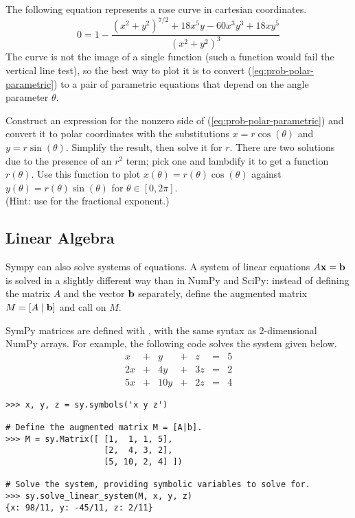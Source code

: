 \begin{problem}
The following equation represents a rose curve in cartesian coordinates.
\begin{equation}
0 = 1 - \frac{(x^2 + y^2)^{7/2} + 18x^5 y - 60x^3 y^3 + 18xy^5}{(x^2 + y^2)^3}
\label{eq:prob-polar-parametric}
\end{equation}
The curve is not the image of a single function (such a function would fail the vertical line test), so the best way to plot it is to convert (\ref{eq:prob-polar-parametric}) to a pair of parametric equations that depend on the angle parameter $\theta$.

Construct an expression for the nonzero side of (\ref{eq:prob-polar-parametric}) and convert it to polar coordinates with the substitutions $x = r\cos(\theta)$ and $y = r\sin(\theta)$.
Simplify the result, then solve it for $r$.
There are two solutions due to the presence of an $r^2$ term; pick one and lambdify it to get a function $r(\theta)$.
Use this function to plot $x(\theta) = r(\theta)\cos(\theta)$ against $y(\theta) = r(\theta)\sin(\theta)$ for $\theta \in [0,2\pi]$.
\\(Hint: use  for the fractional exponent.)
\end{problem}

\subsection*{Linear Algebra} %

Sympy can also solve systems of equations.
A system of linear equations $A\mathbf{x} = \mathbf{b}$ is solved in a slightly different way than in NumPy and SciPy: instead of defining the matrix $A$ and the vector $\mathbf{b}$ separately, define the augmented matrix $M = [A\mid\mathbf{b}]$ and call  on $M$.

SymPy matrices are defined with , with the same syntax as $2$-dimensional NumPy arrays.
For example, the following code solves the system given below.
\[
\begin{array}{rrrrrrr}
 x & + &   y & + &  z & = & 5 \\
2x & + &  4y & + & 3z & = & 2 \\
5x & + & 10y & + & 2z & = & 4
\end{array}
\]
\begin{lstlisting}
>>> x, y, z = sy.symbols('x y z')

# Define the augmented matrix M = [A|b].
>>> M = sy.Matrix([ [1,  1, 1, 5],
                    [2,  4, 3, 2],
                    [5, 10, 2, 4] ])

# Solve the system, providing symbolic variables to solve for.
>>> sy.solve_linear_system(M, x, y, z)
{x: 98/11, y: -45/11, z: 2/11}
\end{lstlisting}

